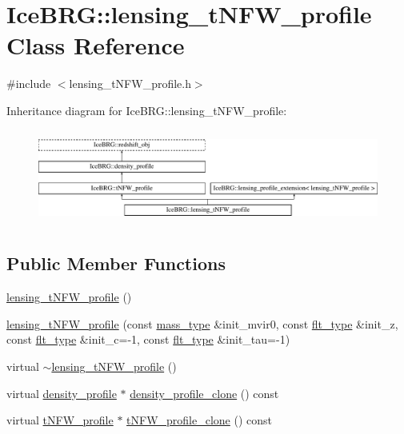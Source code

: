 \hypertarget{classIceBRG_1_1lensing__tNFW__profile}{}\section{Ice\+B\+R\+G\+:\+:lensing\+\_\+t\+N\+F\+W\+\_\+profile Class Reference}
\label{classIceBRG_1_1lensing__tNFW__profile}


{\ttfamily \#include $<$lensing\+\_\+t\+N\+F\+W\+\_\+profile.\+h$>$}

Inheritance diagram for Ice\+B\+R\+G\+:\+:lensing\+\_\+t\+N\+F\+W\+\_\+profile\+:\begin{figure}[H]
\begin{center}
\leavevmode
\includegraphics[height=3.146068cm]{classIceBRG_1_1lensing__tNFW__profile}
\end{center}
\end{figure}
\subsection*{Public Member Functions}
\begin{DoxyCompactItemize}
\item 
\hyperlink{classIceBRG_1_1lensing__tNFW__profile_a5fe1c91ba555af2dce8af625e544331b}{lensing\+\_\+t\+N\+F\+W\+\_\+profile} ()
\item 
\hyperlink{classIceBRG_1_1lensing__tNFW__profile_a65bbc405f339adc927f41b778ca3bcc8}{lensing\+\_\+t\+N\+F\+W\+\_\+profile} (const \hyperlink{namespaceIceBRG_a1be72ac4918a9b029f2eefa084213e35}{mass\+\_\+type} \&init\+\_\+mvir0, const \hyperlink{lib_2IceBRG__main_2common_8h_ad0f130a56eeb944d9ef2692ee881ecc4}{flt\+\_\+type} \&init\+\_\+z, const \hyperlink{lib_2IceBRG__main_2common_8h_ad0f130a56eeb944d9ef2692ee881ecc4}{flt\+\_\+type} \&init\+\_\+c=-\/1, const \hyperlink{lib_2IceBRG__main_2common_8h_ad0f130a56eeb944d9ef2692ee881ecc4}{flt\+\_\+type} \&init\+\_\+tau=-\/1)
\item 
virtual \hyperlink{classIceBRG_1_1lensing__tNFW__profile_ab80da109e4628eb0b1d0915b241cb668}{$\sim$lensing\+\_\+t\+N\+F\+W\+\_\+profile} ()
\item 
virtual \hyperlink{classIceBRG_1_1density__profile}{density\+\_\+profile} $\ast$ \hyperlink{classIceBRG_1_1lensing__tNFW__profile_af196f26f5ed61c128e2931157676eb3a}{density\+\_\+profile\+\_\+clone} () const 
\item 
virtual \hyperlink{classIceBRG_1_1tNFW__profile}{t\+N\+F\+W\+\_\+profile} $\ast$ \hyperlink{classIceBRG_1_1lensing__tNFW__profile_a6954e2ab7524e90a2b1f61b7387982d7}{t\+N\+F\+W\+\_\+profile\+\_\+clone} () const 
\end{DoxyCompactItemize}

